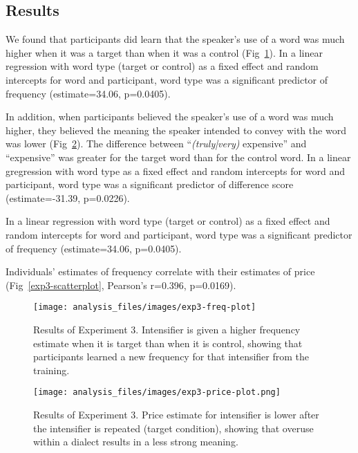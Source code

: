 \documentclass[10pt,letterpaper]{article}
\begin{document}
\subsection{Results}

We found that participants did learn that the speaker's use of a word was much higher when it was a target than when it was a control (Fig~\ref{exp3-freq-plot}). In a linear regression with word type (target or control) as a fixed effect and random intercepts for word and participant, word type was a significant predictor of frequency (estimate=34.06, p=0.0405).

In addition, when participants believed the speaker's use of a word was much higher, they believed the meaning the speaker intended to convey with the word was lower (Fig~\ref{exp3-price-plot}). The difference between ``\emph{(truly|very)} expensive'' and ``expensive'' was greater for the target word than for the control word. In a linear gregression with word type as a fixed effect and random intercepts for word and participant, word type was a significant predictor of difference score (estimate=-31.39, p=0.0226).

In a linear regression with word type (target or control) as a fixed effect and random intercepts for word and participant, word type was a significant predictor of frequency (estimate=34.06, p=0.0405).

Individuals' estimates of frequency correlate with their estimates of price (Fig~\ref{exp3-scatterplot}, Pearson's r=0.396, p=0.0169).

\begin{figure}[ht]
\begin{center}
\texttt{[image: analysis\_files/images/exp3-freq-plot]}
\end{center}
\caption{Results of Experiment 3. Intensifier is given a higher frequency estimate when it is target than when it is control, showing that participants learned a new frequency for that intensifier from the training.} 
\label{exp3-freq-plot}
\end{figure}

\begin{figure}[ht]
\begin{center}
\texttt{[image: analysis\_files/images/exp3-price-plot.png]}
\end{center}
\caption{Results of Experiment 3. Price estimate for intensifier is lower after the intensifier is repeated (target condition), showing that overuse within a dialect results in a less strong meaning.} 
\label{exp3-price-plot}
\end{figure}
\end{document}
